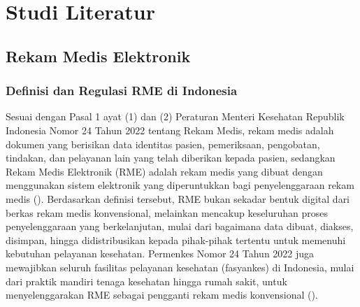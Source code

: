 %

\chapter{Studi Literatur}
\label{ch:studi-literatur}

\section{Rekam Medis Elektronik}
\label{sec:rme}

\subsection{Definisi dan Regulasi RME di Indonesia}
\label{subsec:definisi-regulasi-rme}

Sesuai dengan Pasal 1 ayat (1) dan (2) Peraturan Menteri Kesehatan
Republik Indonesia Nomor 24 Tahun 2022 tentang Rekam Medis, rekam
medis adalah dokumen yang berisikan data identitas pasien,
pemeriksaan, pengobatan, tindakan, dan pelayanan lain yang telah
diberikan kepada pasien, sedangkan Rekam Medis Elektronik (RME) adalah
rekam medis yang dibuat dengan menggunakan sistem elektronik yang
diperuntukkan bagi penyelenggaraan rekam medis
(\cite{permenkes24_2022}). Berdasarkan definisi tersebut, RME bukan
sekadar bentuk digital dari berkas rekam medis konvensional, melainkan
mencakup keseluruhan proses penyelenggaraan yang berkelanjutan, mulai
dari bagaimana data dibuat, diakses, disimpan, hingga didistribusikan
kepada pihak-pihak tertentu untuk memenuhi kebutuhan pelayanan
kesehatan. Permenkes Nomor 24 Tahun 2022 juga mewajibkan seluruh
fasilitas pelayanan kesehatan (fasyankes) di Indonesia, mulai dari
praktik mandiri tenaga kesehatan hingga rumah sakit, untuk
menyelenggarakan RME sebagai pengganti rekam medis konvensional
(\cite{permenkes24_2022}).

